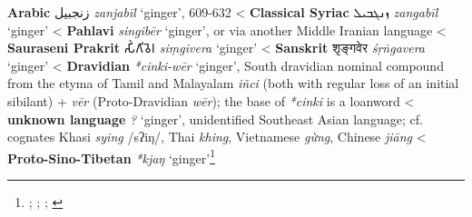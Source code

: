 \begin{etymology}\label{ety:zanjabil}
\textbf{Arabic} {زنجبيل} \textit{zanjabīl} `ginger', 609-632
< \textbf{Classical Syriac} {ܙܢܓܒܝܠ} \textit{zangabīl} `ginger'
< \textbf{Pahlavi} \textit{singibēr} `ginger', or via another Middle Iranian language
< \textbf{Sauraseni Prakrit} {𑀲𑀺𑀁𑀕𑀺𑀯𑁂𑀭} \textit{siṃgivera} `ginger'
< \textbf{Sanskrit} {शृङ्गवेर} \textit{śṛṅgavera} `ginger'
< \textbf{Dravidian} \textit{*cinki-wēr} `ginger', South dravidian nominal compound  from the etyma of Tamil and Malayalam \textit{iñci} (both with regular loss of an initial sibilant) + \textit{vēr} (Proto-Dravidian \textit{wēr}); the base of \textit{*cinki} is a loanword
< \textbf{unknown language} \textit{?} `ginger', unidentified Southeast Asian language; cf. cognates Khasi \textit{sying} /sʔiŋ/, Thai \textit{khing}, Vietnamese \textit{gừng}, Chinese \textit{jiāng}
< \textbf{Proto-Sino-Tibetan} \textit{*kjaŋ} `ginger'\footnote{\textcite{cal}; \textcite[90]{ciancaglini_iranian_2008}; \textcite[5]{krishnamurti_dravidian_2003}; \textcite{oed}}
\end{etymology}